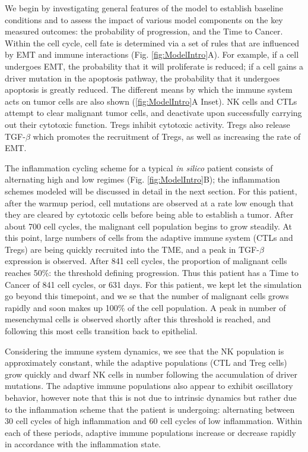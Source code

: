 \documentclass[11pt]{article}
\begin{document}
We begin by investigating general features of the model to establish baseline conditions and to assess the impact of various model components on the key measured outcomes: the probability of progression, and the Time to Cancer. 
Within the cell cycle, cell fate is determined via a set of rules that are influenced by EMT and immune interactions (Fig. \ref{fig:ModelIntro}A). For example, if a cell undergoes EMT, the probability that it will proliferate is reduced; if a cell gains a driver mutation in the apoptosis pathway, the probability that it undergoes apoptosis is greatly reduced.
The different means by which the immune system acts on tumor cells are also shown (\ref{fig:ModelIntro}A Inset). NK cells and CTLs attempt to clear malignant tumor cells, and deactivate upon successfully carrying out their cytotoxic function.
Tregs inhibit cytotoxic activity.
Tregs also release TGF-$\beta$ which promotes the recruitment of Tregs, as well as increasing the rate of EMT.
\par
The inflammation cycling scheme for a typical {\it in silico} patient consists of alternating high and low regimes (Fig. \ref{fig:ModelIntro}B); the inflammation schemes modeled will be discussed in detail in the next section.
For this patient, after the warmup period, cell mutations are observed at a rate low enough that they are cleared by cytotoxic cells before being able to establish a tumor.
After about 700 cell cycles, the malignant cell population begins to grow steadily.
At this point, large numbers of cells from the adaptive immune system (CTLs and Tregs) are being quickly recruited into the TME, and a peak in TGF-$\beta$ expression is observed.
After 841 cell cycles, the proportion of malignant cells reaches 50\%: the threshold defining progression.
Thus this patient has a Time to Cancer of 841 cell cycles, or 631 days.
For this patient, we kept let the simulation go beyond this timepoint, and we se that the number of malignant cells grows rapidly and soon makes up 100\% of the cell population.
A peak in number of mesenchymal cells is observed shortly after this threshold is reached, and following this most cells transition back to epithelial.
\par 
Considering the immune system dynamics, we see that the NK population is approximately constant, while the adaptive populations (CTL and Treg cells) grow quickly and dwarf NK cells in number following the accumulation of driver mutations.
The adaptive immune populations also appear to exhibit oscillatory behavior, however note that this is not due to intrinsic dynamics but rather due to the inflammation scheme that the patient is undergoing: alternating between 30 cell cycles of high inflammation and 60 cell cycles of low inflammation. Within each of these periods, adaptive immune populations increase or decrease rapidly in accordance with the inflammation state.
\end{document}
